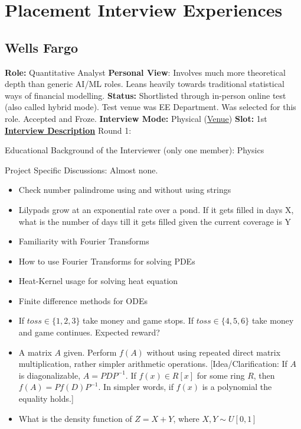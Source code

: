 \documentclass[12pt]{article}
\begin{document}
\section{Placement Interview Experiences}
\subsection{Wells Fargo}
\textbf{Role:} Quantitative Analyst
\newline
\textbf{Personal View}: Involves much more theoretical depth than generic AI/ML roles. Leans heavily towards traditional statistical ways of financial modelling.
\newline
\textbf{Status:} Shortlisted through in-person online test (also called hybrid mode). Test venue was EE Department. Was selected for this role. Accepted and Froze.
\newline
\textbf{Interview Mode:} Physical (\href{https://maps.app.goo.gl/jMx4j9REmH2mdeeA6}{Venue})
\newline
\textbf{Slot:} 1st
\vspace{10pt}
\newline
\underline{\textbf{Interview Description}}
\newline
\newline
Round 1: 

Educational Background of the Interviewer (only one member): Physics

Project Specific Discussions: Almost none.

\begin{itemize}
    \item Check number palindrome using and without using strings
    \item Lilypads grow at an exponential rate over a pond. If it gets filled in days X, what is the number of days till it gets filled given the current coverage is Y
    \item Familiarity with Fourier Transforms
    \item How to use Fourier Transforms for solving PDEs
    \item Heat-Kernel usage for solving heat equation
    \item Finite difference methods for ODEs
    \item If $toss \in \{1,2,3\}$ take money and game stops. If $toss \in \{4,5,6\}$ take money and game continues. Expected reward?
    \item A matrix $A$ given. Perform $f(A)$ without using repeated direct matrix multiplication, rather simpler arithmetic operations. [Idea/Clarification: If $A$ is diagonalizable, $A=PDP^{-1}$. If $f(x) \in R[x]$ for some ring $R$, then $f(A)=Pf(D)P^{-1}$. In simpler words, if $f(x)$ is a polynomial the equality holds.]
    \item What is the density function of $Z=X+Y$, where $X, Y \sim U[0,1]$ 
\end{itemize}
\end{document}
